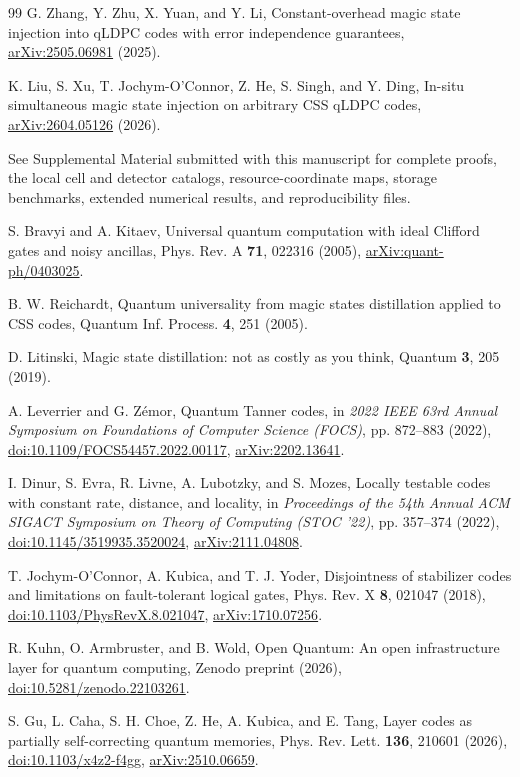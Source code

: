 \begin{thebibliography}{99}
G. Zhang, Y. Zhu, X. Yuan, and Y. Li, Constant-overhead magic state injection into qLDPC codes with error independence guarantees, \href{https://arxiv.org/abs/2505.06981}{arXiv:2505.06981} (2025).

K. Liu, S. Xu, T. Jochym-O'Connor, Z. He, S. Singh, and Y. Ding, In-situ simultaneous magic state injection on arbitrary CSS qLDPC codes, \href{https://arxiv.org/abs/2604.05126}{arXiv:2604.05126} (2026).

See Supplemental Material submitted with this manuscript for complete proofs, the local cell and detector catalogs, resource-coordinate maps, storage benchmarks, extended numerical results, and reproducibility files.

S. Bravyi and A. Kitaev, Universal quantum computation with ideal Clifford gates and noisy ancillas, Phys. Rev. A \textbf{71}, 022316 (2005), \href{https://arxiv.org/abs/quant-ph/0403025}{arXiv:quant-ph/0403025}.

B. W. Reichardt, Quantum universality from magic states distillation applied to CSS codes, Quantum Inf. Process. \textbf{4}, 251 (2005).

D. Litinski, Magic state distillation: not as costly as you think, Quantum \textbf{3}, 205 (2019).

A. Leverrier and G. Z\'emor, Quantum Tanner codes, in \emph{2022 IEEE 63rd Annual Symposium on Foundations of Computer Science (FOCS)}, pp. 872--883 (2022), \href{https://doi.org/10.1109/FOCS54457.2022.00117}{doi:10.1109/FOCS54457.2022.00117}, \href{https://arxiv.org/abs/2202.13641}{arXiv:2202.13641}.

I. Dinur, S. Evra, R. Livne, A. Lubotzky, and S. Mozes, Locally testable codes with constant rate, distance, and locality, in \emph{Proceedings of the 54th Annual ACM SIGACT Symposium on Theory of Computing (STOC '22)}, pp. 357--374 (2022), \href{https://doi.org/10.1145/3519935.3520024}{doi:10.1145/3519935.3520024}, \href{https://arxiv.org/abs/2111.04808}{arXiv:2111.04808}.

T. Jochym-O'Connor, A. Kubica, and T. J. Yoder, Disjointness of stabilizer codes and limitations on fault-tolerant logical gates, Phys. Rev. X \textbf{8}, 021047 (2018), \href{https://doi.org/10.1103/PhysRevX.8.021047}{doi:10.1103/PhysRevX.8.021047}, \href{https://arxiv.org/abs/1710.07256}{arXiv:1710.07256}.

R. Kuhn, O. Armbruster, and B. Wold, Open Quantum: An open infrastructure layer for quantum computing, Zenodo preprint (2026), \href{https://doi.org/10.5281/zenodo.22103261}{doi:10.5281/zenodo.22103261}.

S. Gu, L. Caha, S. H. Choe, Z. He, A. Kubica, and E. Tang, Layer codes as partially self-correcting quantum memories, Phys. Rev. Lett. \textbf{136}, 210601 (2026), \href{https://doi.org/10.1103/x4z2-f4gg}{doi:10.1103/x4z2-f4gg}, \href{https://arxiv.org/abs/2510.06659}{arXiv:2510.06659}.
\end{thebibliography}
